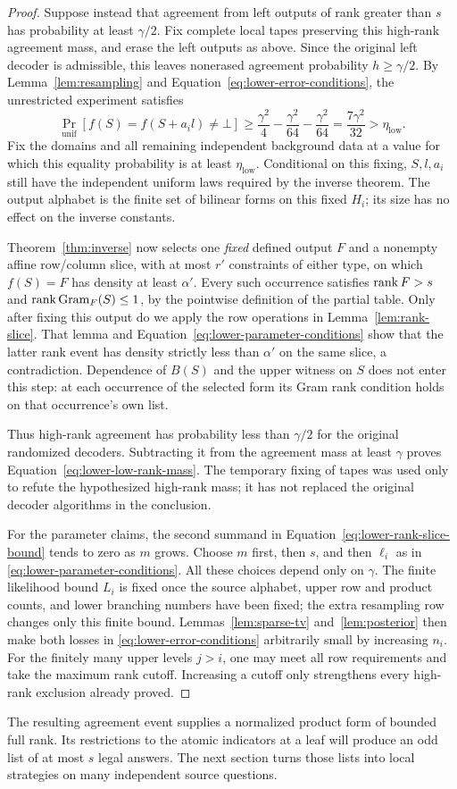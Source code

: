 \begin{proof}
Suppose instead that agreement from left outputs of rank greater than
$s$ has probability at least $\gamma/2$.  Fix complete local tapes
preserving this high-rank agreement mass, and erase the left outputs
as above.  Since the original left decoder is admissible, this leaves
nonerased agreement probability $h\geq\gamma/2$.  By
Lemma~\ref{lem:resampling} and
Equation~\ref{eq:lower-error-conditions}, the unrestricted experiment
satisfies
\[
 \Pr_{\mathrm{unif}}[f(S)=f(S+a_i l)\ne\bot]
 \geq\frac{\gamma^2}{4}-\frac{\gamma^2}{64}
                         -\frac{\gamma^2}{64}
 =\frac{7\gamma^2}{32}>\eta_{\mathrm{low}}.
\]
Fix the domains and all remaining independent background data at a
value for which this equality probability is at least
$\eta_{\mathrm{low}}$.  Conditional on this fixing, $S,l,a_i$ still
have the independent uniform laws required by the inverse theorem.
The output alphabet is the finite set of bilinear forms on this fixed
$H_i$; its size has no effect on the inverse constants.

Theorem~\ref{thm:inverse} now selects one \emph{fixed} defined output
$F$ and a nonempty affine row/column slice, with at most $r'$ constraints
of either type, on which $f(S)=F$ has density at least $\alpha'$.
Every such occurrence satisfies $\operatorname{rank} F>s$ and
$\operatorname{rank}\operatorname{Gram}_F(S)\leq1$, by the pointwise definition of
the partial table.  Only after fixing this output do we apply the row
operations in Lemma~\ref{lem:rank-slice}.  That lemma and
Equation~\ref{eq:lower-parameter-conditions} show that the latter
rank event has density strictly less than $\alpha'$ on the same slice,
a contradiction.  Dependence of $B(S)$ and the upper witness on $S$
does not enter this step: at each occurrence of the selected form its
Gram rank condition holds on that occurrence's own list.

Thus high-rank agreement has probability less than $\gamma/2$ for the
original randomized decoders.  Subtracting it from the agreement mass
at least $\gamma$ proves Equation~\ref{eq:lower-low-rank-mass}.  The
temporary fixing of tapes was used only to refute the hypothesized
high-rank mass; it has not replaced the original decoder algorithms
in the conclusion.

For the parameter claims, the second summand in
Equation~\ref{eq:lower-rank-slice-bound} tends to zero as $m$ grows.
Choose $m$ first, then $s$, and then $\ell_i$ as in
\eqref{eq:lower-parameter-conditions}.  All these choices depend only
on $\gamma$.  The finite likelihood bound $L_i$ is fixed once the
source alphabet, upper row and product counts, and lower branching
numbers have been fixed; the extra resampling row changes only this
finite bound.  Lemmas~\ref{lem:sparse-tv} and~\ref{lem:posterior} then
make both losses in \eqref{eq:lower-error-conditions} arbitrarily small
by increasing $n_i$.  For the finitely many upper levels $j>i$, one
may meet all row requirements and take the maximum rank cutoff.
Increasing a cutoff only strengthens every high-rank exclusion already
proved.
\end{proof}

The resulting agreement event supplies a normalized product form of
bounded full rank.  Its restrictions to the atomic indicators at a
leaf will produce an odd list of at most $s$ legal answers.  The next
section turns those lists into local strategies on many independent
source questions.
